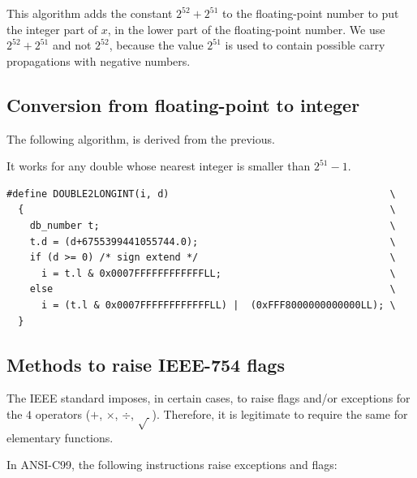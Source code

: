 This algorithm adds the constant $2^{52}+2^{51}$ to the floating-point
number to put the integer part of $x$, in the lower part of the
floating-point number.  We use $2^{52}+2^{51}$ and not $2^{52}$,
because the value $2^{51}$ is used to contain possible carry
propagations with negative numbers.


\subsection{Conversion from floating-point to integer \label{sec:double2longint}}

\begin{theorem}
  The following algorithm, is derived from the previous.

  It works for any double whose nearest integer is smaller than $2^{51} -1$.

\begin{lstlisting}[label={chap0:lst:conversion3},caption={Conversion from FP to long long int},firstnumber=1]
#define DOUBLE2LONGINT(i, d)                                      \
  {                                                               \
    db_number t;                                                  \
    t.d = (d+6755399441055744.0);                                 \
    if (d >= 0) /* sign extend */                                 \
      i = t.l & 0x0007FFFFFFFFFFFFLL;                             \
    else                                                          \
      i = (t.l & 0x0007FFFFFFFFFFFFLL) |  (0xFFF8000000000000LL); \
  }
\end{lstlisting}

\end{theorem}




\subsection{Methods to raise IEEE-754 flags}

The IEEE standard imposes, in certain cases, to raise flags and/or
exceptions for the $4$ operators ($+$, $\times$, $\div$, $\sqrt{~}$).
Therefore, it is legitimate to require the same for elementary
functions.

In ANSI-C99, the following instructions raise exceptions and
flags:

